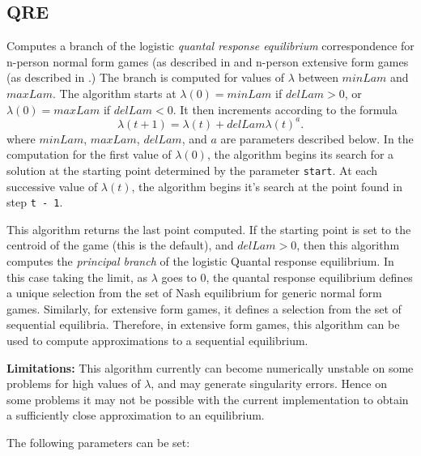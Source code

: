 \documentclass[12pt]{report}
\begin{document}
\subsection{QRE}\label{QRE}
Computes a branch of the logistic {\em quantal response equilibrium} 
correspondence for n-person normal form games (as described 
in \cite{McKPal:95a}  and n-person extensive form games (as described 
in \cite{McKPal:95b}.) The branch is computed 
for values of $\lambda$ between $minLam$ and $maxLam$.  The algorithm 
starts at $\lambda(0) = minLam$ if $delLam > 0$, or 
$\lambda(0) = maxLam$ if 
$delLam < 0$. It then increments according to the formula 
$$
\lambda(t+1) = \lambda(t) +delLam \lambda(t)^a.
$$
where $minLam$, $maxLam$, $delLam$, and $a$ are
parameters described below. In the computation for the first value of
$\lambda(0)$, the algorithm begins its search for a solution at the
starting point determined by the parameter \verb+start+.  At each
successive value of $\lambda(t)$, the algorithm begins it's search at
the point found in step \verb+t - 1+.  

This algorithm returns the last point computed.  If the starting point
is set to the centroid of the game (this is the default), and $delLam 
> 0$, then this algorithm computes the {\em principal branch} of the
logistic Quantal response equilibrium.  In this case taking the limit,
as $\lambda$ goes to 0, the quantal response equilibrium defines a
unique selection from the set of Nash equilibrium for generic normal
form games.  Similarly, for extensive form games, it defines a
selection from the set of sequential equilibria.  Therefore, in
extensive form games, this algorithm can be used to compute
approximations to a sequential equilibrium.

{\bf Limitations:} This algorithm currently can become numerically
unstable on some problems for high values of $\lambda$, and may
generate singularity errors.  Hence on some problems it may not be
possible with the current implementation to obtain a sufficiently
close approximation to an equilibrium.

The following parameters can be set:
\end{document}
